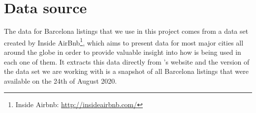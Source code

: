 

\section{Data source}%
\label{sec:data_source}

The \airbnb data for Barcelona listings that we use in this project comes from a data
set \cite{dataset} created by Inside AirBnb\footnote{Inside Airbnb: \url{http://insideairbnb.com/}},
which aims to present \airbnb data for most major cities all around the globe in
order to provide valuable insight into how \airbnb is being used in each one of them. It 
extracts this data directly from \airbnb's website and the version of the data set 
we are working with is a snapshot of all Barcelona listings that were available 
on the 24th of August 2020.